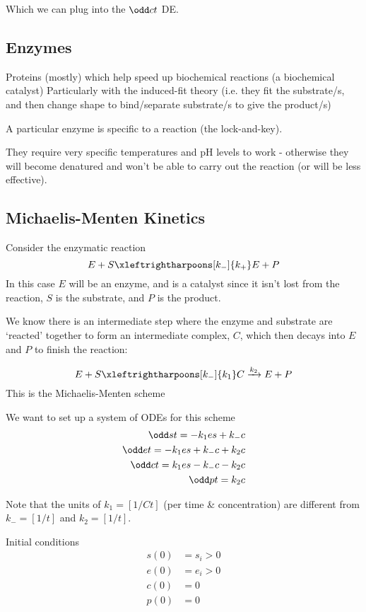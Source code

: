 \documentclass{X:/Documents/Coding/Latex/myassignment}
\begin{document}
Which we can plug into the $\odd ct$ DE.

\subsection{Enzymes}

Proteins (mostly) which help speed up biochemical reactions (a biochemical catalyst)
Particularly with the induced-fit theory (i.e. they fit the substrate/s, and then change shape to bind/separate substrate/s to give the product/s)

A particular enzyme is specific to a reaction (the lock-and-key).

They require very specific temperatures and pH levels to work - otherwise they will become denatured and won't be able to carry out the reaction (or will be less effective).

\subsection{Michaelis-Menten Kinetics}
Consider the enzymatic reaction
\[E + S \xleftrightharpoons[k_-]{k_+} E + P\]
In this case $E$ will be an enzyme, and is a catalyst since it isn't lost from the reaction, $S$ is the substrate, and $P$ is the product.

We know there is an intermediate step where the enzyme and substrate are `reacted' together to form an intermediate complex, $C$, which then decays into $E$ and $P$ to finish the reaction:

\[E + S \xleftrightharpoons[k_-]{k_1} C \xrightarrow{k_2} E + P\]
This is the Michaelis-Menten scheme

We want to set up a system of ODEs for this scheme
\begin{align*}
	\odd st = - k_1 es + k_- c\\
	\odd et = -k_1 es + k_- c + k_2 c\\
	\odd ct = k_1 es - k_- c - k_2 c\\
	\odd pt = k_2 c
\end{align*}

Note that the units of $k_1 = [1/Ct]$ (per time \& concentration) are different from $k_- = [1/t]$ and $k_2 = [1/t]$.

Initial conditions
\begin{align*}
	s(0) &= s_i > 0\\
	e(0) &= e_i > 0\\
	c(0) &= 0\\
	p(0) &= 0
\end{align*}
\end{document}
